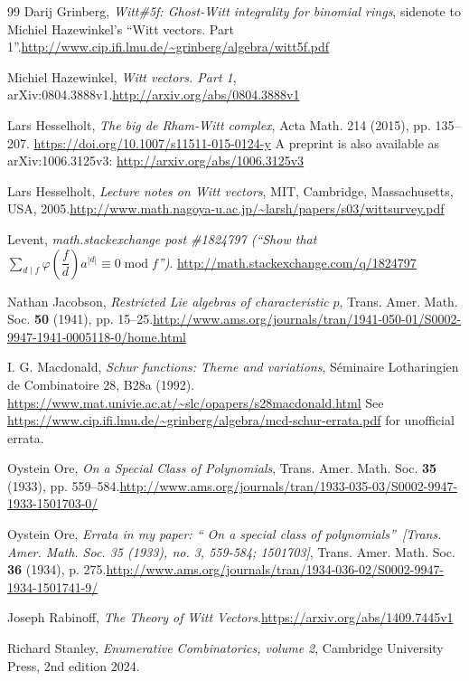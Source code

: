 \documentclass[numbers=enddot,12pt,final,onecolumn,notitlepage]{scrartcl}%
\theoremstyle{definition}
\let\sumnonlimits\sum
\renewcommand{\sum}{\sumnonlimits\limits}
\begin{document}
\begin{thebibliography}{99}
Darij Grinberg, \textit{Witt\#5f: Ghost-Witt integrality
for binomial rings}, sidenote to Michiel Hazewinkel's \textquotedblleft Witt
vectors. Part 1\textquotedblright.\newline\url{http://www.cip.ifi.lmu.de/~grinberg/algebra/witt5f.pdf}

Michiel Hazewinkel, \textit{Witt vectors. Part 1},
arXiv:0804.3888v1.\newline\url{http://arxiv.org/abs/0804.3888v1}

Lars Hesselholt, \textit{The big de Rham-Witt
complex}, Acta Math. 214 (2015), pp. 135--207.
\url{https://doi.org/10.1007/s11511-015-0124-y} \newline A preprint is also
available as arXiv:1006.3125v3: \url{http://arxiv.org/abs/1006.3125v3}

Lars Hesselholt, \textit{Lecture notes on Witt
vectors}, MIT, Cambridge, Massachusetts, USA, 2005.\newline\url{http://www.math.nagoya-u.ac.jp/~larsh/papers/s03/wittsurvey.pdf}

Levent, \textit{math.stackexchange post \#1824797
(\textquotedblleft Show that }$\sum_{d\mid f}\varphi\left(  \dfrac{f}%
{d}\right)  a^{\left\vert d\right\vert }\equiv0\operatorname{mod}%
f$\textit{\textquotedblright)}. \url{http://math.stackexchange.com/q/1824797}

Nathan Jacobson, \textit{Restricted Lie algebras of
characteristic }$p$, Trans. Amer. Math. Soc. \textbf{50} (1941), pp.
15--25.\newline\url{http://www.ams.org/journals/tran/1941-050-01/S0002-9947-1941-0005118-0/home.html}

I. G. Macdonald, \textit{Schur functions: Theme and
variations}, S\'{e}minaire Lotharingien de Combinatoire 28, B28a
(1992).\newline%
\url{https://www.mat.univie.ac.at/~slc/opapers/s28macdonald.html} \newline See
\url{https://www.cip.ifi.lmu.de/~grinberg/algebra/mcd-schur-errata.pdf} for
unofficial errata.

Oystein Ore, \textit{On a Special Class of Polynomials},
Trans. Amer. Math. Soc. \textbf{35} (1933), pp. 559--584.\newline\url{http://www.ams.org/journals/tran/1933-035-03/S0002-9947-1933-1501703-0/}

Oystein Ore, \textit{Errata in my paper: \textquotedblleft
On a special class of polynomials\textquotedblright\ [Trans. Amer. Math. Soc.
35 (1933), no. 3, 559-584; 1501703]}, Trans. Amer. Math. Soc. \textbf{36}
(1934), p. 275.\newline\url{http://www.ams.org/journals/tran/1934-036-02/S0002-9947-1934-1501741-9/}

Joseph Rabinoff, \textit{The Theory of Witt
Vectors}.\newline\url{https://arxiv.org/abs/1409.7445v1}

Richard Stanley, \textit{Enumerative Combinatorics,
volume 2}, Cambridge University Press, 2nd edition 2024.
\end{thebibliography}
\end{document}
